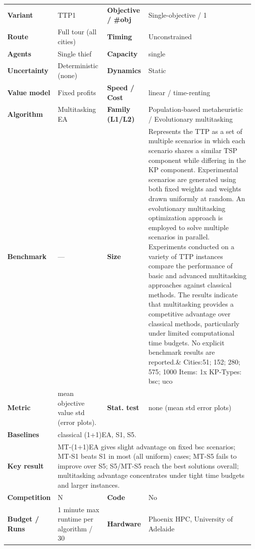 \documentclass[
  a4paper,
  11pt,
  headings=small,
  numbers=noenddot,
  abstract=on,
  parskip=half,
]{scrartcl}
\begin{document}
\begin{landscape}
\begin{longtable}{@{}p{2.6cm}p{8.7cm}p{2.6cm}p{8.7cm}@{}}
\textbf{Variant} & TTP1 & \textbf{Objective / \#obj} & Single-objective / 1 \\
\textbf{Route} & Full tour (all cities) & \textbf{Timing} & Unconstrained \\
\textbf{Agents} & Single thief & \textbf{Capacity} & single \\
\textbf{Uncertainty} & Deterministic (none) & \textbf{Dynamics} & Static \\
\textbf{Value model} & Fixed profits & \textbf{Speed / Cost} & linear / time-renting \\
\textbf{Algorithm} & Multitasking EA & \textbf{Family (L1/L2)} & Population-based metaheuristic / Evolutionary multitasking \\
\textbf{Benchmark} & --- & \textbf{Size} & Represents the TTP as a set of multiple scenarios in which each scenario shares a similar TSP component while differing in the KP component. Experimental scenarios are generated using both fixed weights and weights drawn uniformly at random. An evolutionary multitasking optimization approach is employed to solve multiple scenarios in parallel. Experiments conducted on a variety of TTP instances compare the performance of basic and advanced multitasking approaches against classical methods. The results indicate that multitasking provides a competitive advantage over classical methods, particularly under limited computational time budgets. No explicit benchmark results are reported.\& Cities:51; 152; 280; 575; 1000 \newline Items: 1x \newline KP-Types: bsc; uco \\
\textbf{Metric} & mean objective value std (error plots). & \textbf{Stat. test} & none (mean std error plots) \\
\textbf{Baselines} & \multicolumn{3}{p{20.0cm}}{classical (1+1)EA, S1, S5.} \\
\textbf{Key result} & \multicolumn{3}{p{20.0cm}}{MT-(1+1)EA gives slight advantage on fixed bsc scenarios; MT-S1 beats S1 in most (all uniform) cases; MT-S5 fails to improve over S5; S5/MT-S5 reach the best solutions overall; multitasking advantage concentrates under tight time budgets and larger instances.} \\
\textbf{Competition} & N & \textbf{Code} & No \\
\textbf{Budget / Runs} & 1 minute max runtime per algorithm / 30 & \textbf{Hardware} & Phoenix HPC, University of Adelaide \\

\end{longtable}
\end{landscape}
\end{document}
